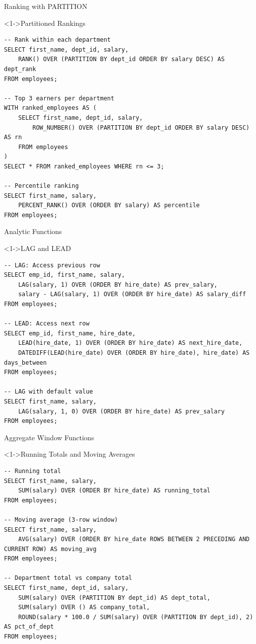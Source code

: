 \documentclass[aspectratio=169,11pt]{beamer}
\begin{document}
\begin{frame}[fragile]{Ranking with PARTITION}
\begin{exampleblock}<1->{Partitioned Rankings}
\begin{lstlisting}
-- Rank within each department
SELECT first_name, dept_id, salary,
    RANK() OVER (PARTITION BY dept_id ORDER BY salary DESC) AS dept_rank
FROM employees;

-- Top 3 earners per department
WITH ranked_employees AS (
    SELECT first_name, dept_id, salary,
        ROW_NUMBER() OVER (PARTITION BY dept_id ORDER BY salary DESC) AS rn
    FROM employees
)
SELECT * FROM ranked_employees WHERE rn <= 3;

-- Percentile ranking
SELECT first_name, salary,
    PERCENT_RANK() OVER (ORDER BY salary) AS percentile
FROM employees;
\end{lstlisting}
\end{exampleblock}
\end{frame}

\begin{frame}[fragile]{Analytic Functions}
\begin{exampleblock}<1->{LAG and LEAD}
\begin{lstlisting}
-- LAG: Access previous row
SELECT emp_id, first_name, salary,
    LAG(salary, 1) OVER (ORDER BY hire_date) AS prev_salary,
    salary - LAG(salary, 1) OVER (ORDER BY hire_date) AS salary_diff
FROM employees;

-- LEAD: Access next row
SELECT emp_id, first_name, hire_date,
    LEAD(hire_date, 1) OVER (ORDER BY hire_date) AS next_hire_date,
    DATEDIFF(LEAD(hire_date) OVER (ORDER BY hire_date), hire_date) AS days_between
FROM employees;

-- LAG with default value
SELECT first_name, salary,
    LAG(salary, 1, 0) OVER (ORDER BY hire_date) AS prev_salary
FROM employees;
\end{lstlisting}
\end{exampleblock}
\end{frame}

\begin{frame}[fragile]{Aggregate Window Functions}
\begin{exampleblock}<1->{Running Totals and Moving Averages}
\begin{lstlisting}
-- Running total
SELECT first_name, salary,
    SUM(salary) OVER (ORDER BY hire_date) AS running_total
FROM employees;

-- Moving average (3-row window)
SELECT first_name, salary,
    AVG(salary) OVER (ORDER BY hire_date ROWS BETWEEN 2 PRECEDING AND CURRENT ROW) AS moving_avg
FROM employees;

-- Department total vs company total
SELECT first_name, dept_id, salary,
    SUM(salary) OVER (PARTITION BY dept_id) AS dept_total,
    SUM(salary) OVER () AS company_total,
    ROUND(salary * 100.0 / SUM(salary) OVER (PARTITION BY dept_id), 2) AS pct_of_dept
FROM employees;
\end{lstlisting}
\end{exampleblock}
\end{frame}
\end{document}
